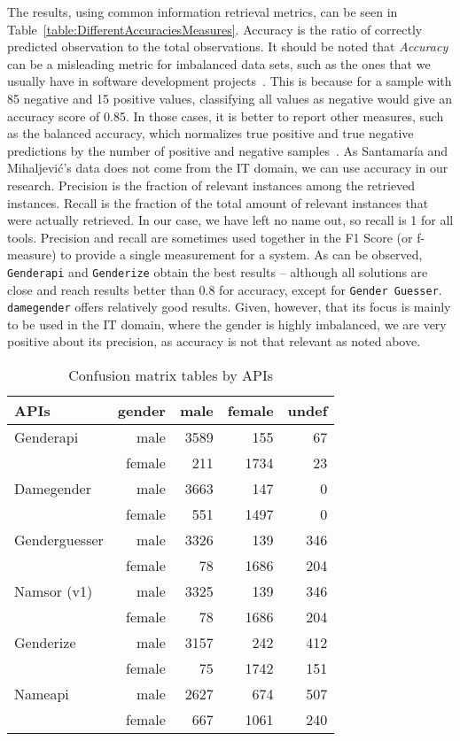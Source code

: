\documentclass[a4paper]{article}
\begin{document}
The results, using common information retrieval metrics, can be seen in Table~\ref{table:DifferentAccuraciesMeasures}.
Accuracy is the ratio of correctly predicted observation to the total observations.
It should be noted that \emph{Accuracy} can be a misleading metric for imbalanced data sets, such as the ones that we usually have in software development projects~\cite{ghosh2002free}.
This is because for a sample with 85 negative and 15 positive values, classifying all values as negative would give an accuracy score of 0.85.
In those cases, it is better to report other measures, such as the balanced accuracy, which normalizes true positive and true negative predictions by the number of positive and negative samples~\cite{mower2005prep}.
As Santamaría and Mihaljevi\'c's data does not come from the IT domain, we can use accuracy in our research.
Precision is the fraction of relevant instances among the retrieved instances.
Recall is the fraction of the total amount of relevant instances that were actually retrieved.
In our case, we have left no name out, so recall is 1 for all tools.
Precision and recall are sometimes used together in the F1 Score (or f-measure) to provide a single measurement for a system.
As can be observed, \texttt{Genderapi} and \texttt{Genderize} obtain the best results -- although all solutions are close and reach results better than 0.8 for accuracy, except for \texttt{Gender Guesser}.
\texttt{damegender} offers relatively good results.
Given, however, that its focus is mainly to be used in the IT domain, where the gender is highly imbalanced, we are very positive about its precision, as accuracy is not that relevant as noted above.




\begin{table}[t]
\footnotesize
\begin{tabular}[]{lrrrr}
  \hline
  APIs          & gender & male & female & undef \tabularnewline
\hline
Genderapi         & male    & 3589 & 155  &  67 \tabularnewline
                  & female  & 211  & 1734 &  23 \tabularnewline
Damegender        & male    & 3663 & 147  &   0 \tabularnewline
                  & female  & 551  & 1497 &   0 \tabularnewline
Genderguesser     & male    & 3326 &  139 & 346 \tabularnewline
                  & female  & 78   & 1686 & 204 \tabularnewline
Namsor (v1)       & male    & 3325 & 139  & 346 \tabularnewline
                  & female  & 78   & 1686 & 204 \tabularnewline
Genderize         & male    & 3157 & 242  & 412 \tabularnewline
                  & female  & 75   & 1742 & 151 \tabularnewline
Nameapi           & male    & 2627 & 674  & 507 \tabularnewline
                  & female  & 667  & 1061 & 240 \tabularnewline 
\hline
\end{tabular}
\caption{Confusion matrix tables by APIs}
\label{table:ConfusionMatrixTables}
\end{table}
\end{document}
